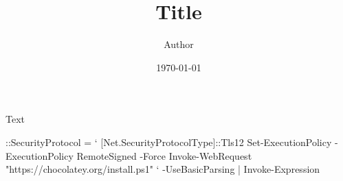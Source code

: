 \documentclass{ltxdoc}
\title{Title}
\author{Author}
\date{\today}
\begin{document}
  \begin{defaultbox}
    Text
    \begin{powershell}
      ::SecurityProtocol = `
        [Net.SecurityProtocolType]::Tls12
      Set-ExecutionPolicy -ExecutionPolicy RemoteSigned -Force
      Invoke-WebRequest "https://chocolatey.org/install.ps1" `
        -UseBasicParsing | Invoke-Expression
    \end{powershell}
  \end{defaultbox}
\end{document}
